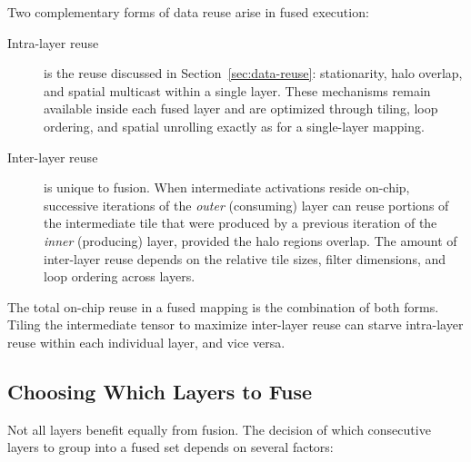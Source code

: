 Two complementary forms of data reuse arise in fused execution:

\begin{description}
  \item[Intra-layer reuse]
    is the reuse discussed in Section~\ref{sec:data-reuse}:
    stationarity, halo overlap, and spatial multicast within a single
    layer.  These mechanisms remain available inside each fused layer and
    are optimized through tiling, loop ordering, and spatial unrolling
    exactly as for a single-layer mapping.

  \item[Inter-layer reuse]
    is unique to fusion.
    When intermediate activations reside on-chip, successive iterations
    of the \emph{outer} (consuming) layer can reuse portions of the
    intermediate tile that were produced by a previous iteration of the
    \emph{inner} (producing) layer, provided the halo regions overlap.
    The amount of inter-layer reuse depends on the relative tile sizes,
    filter dimensions, and loop ordering across layers.
\end{description}

The total on-chip reuse in a fused mapping is the combination of both
forms.  Tiling the
intermediate tensor to maximize inter-layer reuse can starve intra-layer
reuse within each individual layer, and vice versa.

\subsection{Choosing Which Layers to Fuse}
\label{sec:fusion-choices}

Not all layers benefit equally from fusion.  The decision of which
consecutive layers to group into a fused set depends on several factors:


